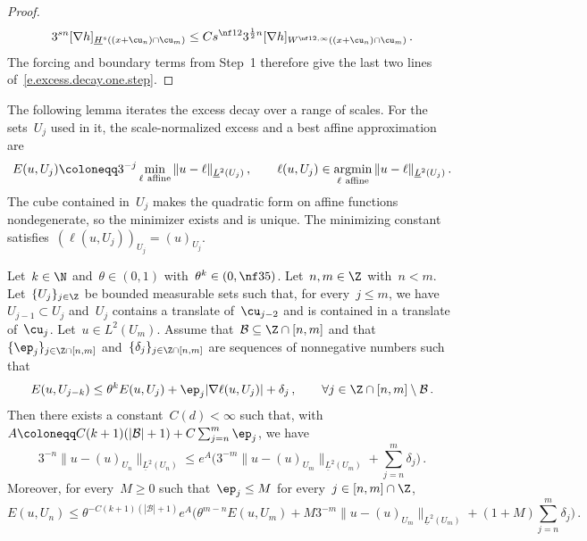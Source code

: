 \documentclass[11pt]{amsart}
\begin{document}
\begin{proof}
\begin{equation*}
	3^{sn}[\nabla h]_{\underline H^s((x+\cu_{n})\cap\cu_m)}
	\leq Cs^{\nf12}3^{\frac{1}{2}n}
	[\nabla h]_{W^{\nf12,\infty}((x+\cu_{n})\cap\cu_m)}\,.
\end{equation*}
The forcing and boundary terms from Step~1 therefore give the last two lines of~\eqref{e.excess.decay.one.step}.
\end{proof}

The following lemma iterates the excess decay over a range of scales. For the sets~$U_j$ used in it, the scale-normalized excess and a best affine approximation are
\begin{equation*}
	E(u,U_j)\coloneqq3^{-j}\min_{\ell\ \mathrm{affine}}\|u-\ell\|_{\underline L^2(U_j)}\,,
	\qquad \ell(u,U_j)\in\mathop{\rm argmin}_{\ell\ \mathrm{affine}}\|u-\ell\|_{\underline L^2(U_j)}\,.
\end{equation*}
The cube contained in~$U_j$ makes the quadratic form on affine functions nondegenerate, so the minimizer exists and is unique. The minimizing constant satisfies~$(\ell(u,U_j))_{U_j}=(u)_{U_j}$.

\begin{lemma}
\label{l.iteration.lemma.GMC}
Let~$k \in \N$ and~$\theta \in (0,1)$ with~$\theta^k \in (0, \nf 35)$. Let~$n,m \in \Z$ with~$n < m$. Let~$\{ U_j \}_{j \in \Z}$ be bounded measurable sets such that, for every~$j\leq m$, we have~$U_{j-1} \subset U_j$ and~$U_j$ contains a translate of~$\cu_{j-2}$ and is contained in a translate of~$\cu_j$. Let~$u \in L^2(U_m)$. Assume that~$\mathcal{B} \subseteq \Z \cap [n,m]$ and that~$\{\ep_j\}_{j \in \Z \cap [n,m]}$ and~$\{\delta_j\}_{j \in \Z \cap [n,m]}$ are sequences of nonnegative numbers such that
\begin{equation}
	E(u,U_{j-k})
	\leq \theta^k E(u,U_{j}) + \ep_j |\nabla \ell(u,U_j)| + \delta_j\,, \qquad \forall j \in \Z \cap [n,m] \setminus \mathcal{B}\,.
	\label{e.Ej.decay.assumption}
\end{equation}
Then there exists a constant~$C(d)<\infty$ such that, with~$A\coloneqq C(k+1)(|\mathcal B|+1)+C\sum_{j=n}^m\ep_j$, we have
\begin{equation}
	3^{-n} \| u - (u)_{U_n} \|_{\underline{L}^2(U_n)}
	\leq
	e^A \biggl(3^{-m} \| u - (u)_{U_m} \|_{\underline{L}^2(U_{m})}
	+ \sum_{j=n}^m \delta_j\biggr)\,.
	\label{e.iteration.slope.lemma}
\end{equation}
Moreover, for every~$M\geq0$ such that~$\ep_j\leq M$ for every~$j\in[n,m]\cap\Z$,
\begin{equation}
	E(u,U_n)
	\leq
	\theta^{-C(k+1)(|\mathcal{B}|+1)}e^A
	\biggl(
	\theta^{m-n} E(u,U_m)
	+M3^{-m} \| u - (u)_{U_m} \|_{\underline{L}^2(U_{m})}
	+(1+M)\sum_{j=n}^m \delta_j
	\biggr)\,.
	\label{e.excess.decay.lemma}
\end{equation}
\end{lemma}
\end{document}
